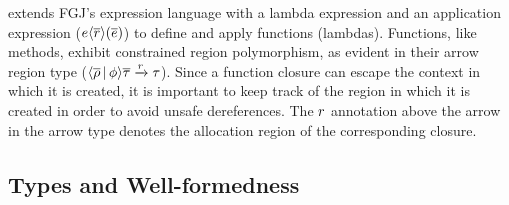 \FB extends FGJ's expression language with a lambda expression and an
application expression ($e\langle \overline{r} \rangle(\overline{e})$) to define
and apply functions (lambdas). Functions, like methods, exhibit
constrained region polymorphism, as evident in their arrow region type
($\langle \overline{\rho} \,|\, \phi \rangle\overline{\tau} \xrightarrow{r}
\tau$).
Since a function closure can escape the context in which it is
created, it is important to keep track of the region in which it is
created in order to avoid unsafe dereferences. The $r$ annotation
above the arrow in the arrow type denotes the allocation region of the
corresponding closure. 

\subsection{Types and Well-formedness}

